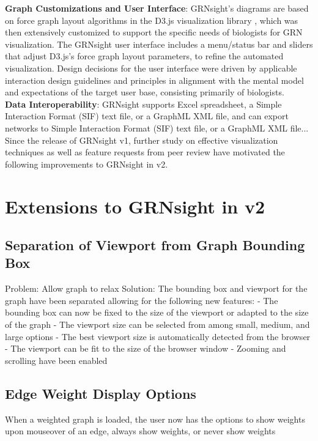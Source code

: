 \documentclass[sigconf,review,anonymous]{acmart}
\begin{document}
\noindent\textbf{Graph Customizations and User Interface}: GRNsight's diagrams are based on force graph layout algorithms in the D3.js visualization library \cite{d3}, which was then extensively customized to support the specific needs of biologists for GRN visualization. The GRNsight user interface includes a menu/status bar and sliders that adjust D3.js's force graph layout parameters, to refine the automated visualization. Design decisions for the user interface were driven by applicable interaction design guidelines and principles \cite{norman2013design,shneiderman2010designing,nielsen1994usability} in alignment with the mental model and expectations of the target user base, consisting primarily of biologists.\\

\noindent\textbf{Data Interoperability}: GRNsight supports Excel spreadsheet, a Simple Interaction Format (SIF) text file, or a GraphML XML file, and can export networks to Simple Interaction Format (SIF) text file, or a GraphML XML file...\\

\noindent
Since the release of GRNsight v1, further study on effective visualization techniques as well as feature requests from peer review have motivated the following improvements to GRNsight in v2.

\section{Extensions to GRNsight in v2}

\subsection{Separation of Viewport from Graph Bounding Box}
Problem: Allow graph to relax
Solution: The bounding box and viewport for the graph have been separated allowing for the following new features: 
- The bounding box can now be fixed to the size of the viewport or adapted to the size of the graph
- The viewport size can be selected from among small, medium, and large options
- The best viewport size is automatically detected from the browser
- The viewport can be fit to the size of the browser window 
- Zooming and scrolling have been enabled


\subsection{Edge Weight Display Options}
When a weighted graph is loaded, the user now has the options to show weights upon mouseover of an edge, always show weights, or never show weights
\end{document}

